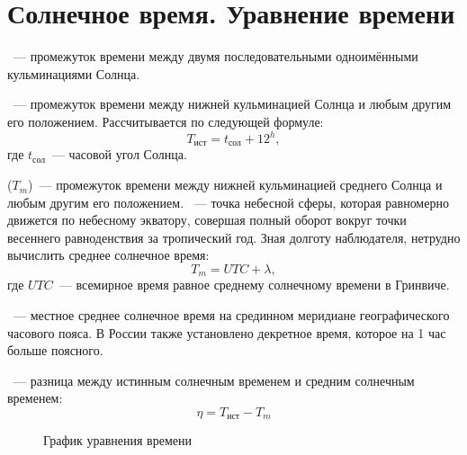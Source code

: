 \section{Солнечное время. Уравнение времени}
~--- промежуток времени между двумя последовательными одноимёнными кульминациями Солнца.

~--- промежуток времени между нижней кульминацией Солнца и любым другим его положением. Рассчитывается по следующей формуле:
\begin{equation}
T_{\text{ист}}=t_{\text{сол}}+12^h,
\end{equation}
где $t_{\text{сол}}$~--- часовой угол Солнца.

 ($T_m$)~--- промежуток времени между нижней кульминацией среднего Солнца и любым другим его положением. ~--- точка небесной сферы, которая равномерно движется по небесному экватору, совершая полный оборот вокруг точки весеннего равноденствия за тропический год. Зная долготу наблюдателя, нетрудно вычислить среднее солнечное время:
\begin{equation}
T_m=UTC+\lambda,
\end{equation}
где $UTC$~--- всемирное время равное среднему солнечному времени в Гринвиче.

~--- местное среднее солнечное время на срединном меридиане географического часового пояса. В России также установлено декретное время, которое на 1 час больше поясного.


~--- разница между истинным солнечным временем и средним солнечным временем:
\begin{equation}
\eta=T_{\text{ист}}-T_m
\end{equation}


\begin{figure}[!h]
\centering
{}
\caption{График уравнения времени}
\end{figure}